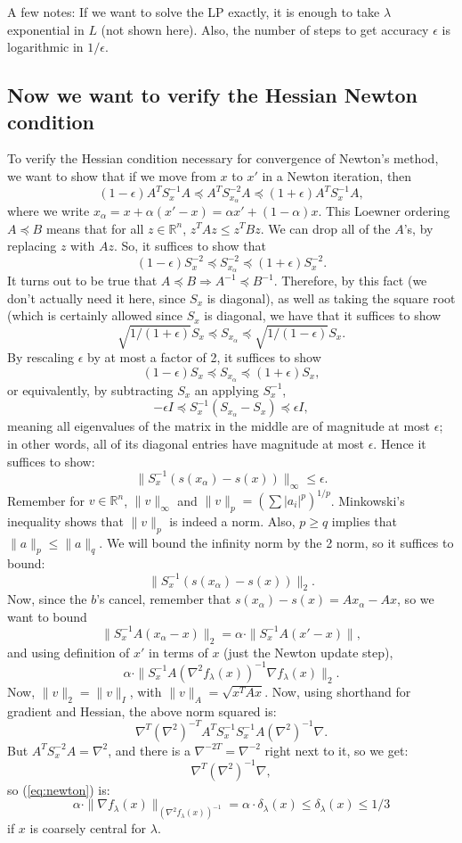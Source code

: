 \documentclass[11pt]{article}
\newcommand{\BR}{\mathbb R}
\newcommand{\ep}{\epsilon}
\begin{document}
A few notes: If we want to solve the LP exactly, it is enough to take $\lambda$ exponential in $L$ (not shown here). Also, the number of steps to get accuracy $\ep$ is logarithmic in $1/\ep$.


\subsection{Now we want to verify the Hessian Newton condition}
To verify the Hessian condition necessary for convergence of Newton's method, we want to show that if we move from $x$ to $x'$ in a Newton iteration, then
$$
(1-\ep)A^T S_x^{-1} A \preceq A^T S_{x_\alpha}^{-2} A \preceq (1+\ep) A^TS_x^{-1}A,
$$
where we write $x_\alpha = x+\alpha(x' -x) = \alpha x' + (1-\alpha) x$. This Loewner ordering $A \preceq B$ means that for all $z \in \BR^n$, $z^TAz \leq z^TBz$. We can drop all of the $A$'s, by replacing $z$ with $Az$. So, it suffices to show that
$$
(1-\ep) S_x^{-2} \preceq S_{x_\alpha}^{-2} \preceq (1+\ep)S_x^{-2}. 
$$
It turns out to be true that $A \preceq B \Rightarrow A^{-1} \preceq B^{-1}$. 
Therefore, by this fact (we don't actually need it here, since $S_x$ is diagonal), as well as taking the square root (which is certainly allowed since $S_x$ is diagonal, we have that it suffices to show
$$
\sqrt{1/(1+\ep)} S_x \preceq S_{x_\alpha} \preceq \sqrt{1/(1-\ep)} S_x.
$$
By rescaling $\ep$ by at most a factor of 2, it suffices to show
$$
(1-\ep) S_x \preceq S_{x_\alpha} \preceq (1+\ep) S_x,
$$
or equivalently, by subtracting $S_x$ an applying $S_x^{-1}$,
$$
-\ep I \preceq S_x^{-1} ( S_{x_\alpha} - S_x) \preceq \ep I,
$$
meaning all eigenvalues of the matrix in the middle are of magnitude at most $\ep$; in other words, all of its diagonal entries have magnitude at most $\ep$. Hence it suffices to show:
$$
\| S_x^{-1} (s(x_\alpha) - s(x)) \|_\infty \leq \ep.
$$
Remember  for $v \in \BR^n$, $\| v\|_\infty$ and $\| v\|_p = (\sum |a_i|^p)^{1/p}$. Minkowski's inequality shows that $\| v\|_p$ is indeed a norm. Also, $p \geq q$ implies that $\| a\|_p \leq \| a\|_q$. We will bound the infinity norm by the 2 norm, so it suffices to bound:
$$
\| S_x^{-1} (s(x_\alpha) - s(x)) \|_2.
$$
Now, since the $b$'s cancel, remember that $s(x_\alpha) - s(x) = Ax_\alpha - Ax$, so we want to bound
$$
\| S_x^{-1} A(x_\alpha - x) \|_2 = \alpha \cdot \| S_x^{-1} A(x' - x)\|,
$$
and using definition of $x'$ in terms of $x$ (just the Newton update step),
\begin{equation}
\label{eq:newton}
\alpha \cdot \| S_x^{-1} A (\nabla^2 f_\lambda(x))^{-1} \nabla f_\lambda(x) \|_2.
\end{equation}
Now, $\| v\|_2 = \| v\|_I$, with $\| v\|_A = \sqrt{x^TAx}$. Now, using shorthand for gradient and Hessian, the above norm squared is:
$$
\nabla^T (\nabla^2)^{-T} A^TS_x^{-1}S_x^{-1} A (\nabla^2)^{-1} \nabla.
$$
But $A^T S_x^{-2} A = \nabla^2$, and there is a $\nabla^{-2T} = \nabla^{-2}$ right next to it, so we get:
$$
\nabla^T (\nabla^2)^{-1} \nabla,
$$
so (\ref{eq:newton}) is:
$$
\alpha \cdot \| \nabla f_\lambda(x) \|_{(\nabla^2 f_\lambda(x))^{-1}}  = \alpha \cdot \delta_\lambda(x) \leq \delta_\lambda(x)\leq 1/3
$$
if $x$ is coarsely central for $\lambda$.
\end{document}

